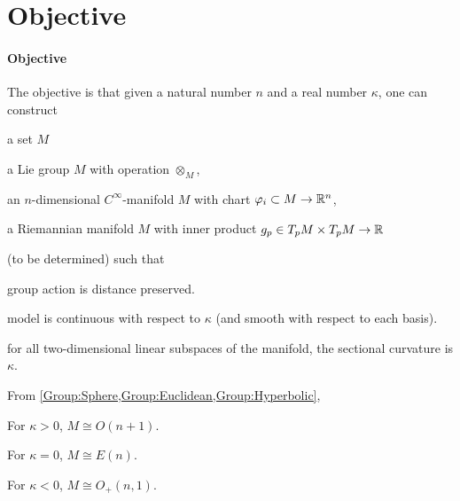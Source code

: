 \documentclass[../main.tex]{subfiles}
\begin{document}
\section{Objective}
\paragraph{Objective}\label{Objective}
The objective is that
given a natural number \(n\) and a real number \(\kappa\),
one can construct
\begin{APAenumerate}
    \item a set \(M\)
    \item a Lie group \(M\) with operation \(\otimes_M\),
    \item an \(n\)-dimensional \(C^\infty\)-manifold \(M\) with chart \(\varphi_i \subset M\to\mathbb{R}^n\),
    \item a Riemannian manifold \(M\) with inner product \(g_p\in T_pM\times T_pM\to\mathbb{R}\)
\end{APAenumerate}
(to be determined)
such that
\begin{APAitemize}
    \item group action is distance preserved.
    \item model is continuous with respect to \(\kappa\) (and smooth with respect to each basis).
    \item for all two-dimensional linear subspaces of the manifold, the sectional curvature is \(\kappa\).
\end{APAitemize}

\begin{conjecture}\label{GeometricGroupStructure}
    From \cref{Group:Sphere,Group:Euclidean,Group:Hyperbolic},
    \begin{APAitemize}
        \item For \(\kappa>0\), \(M\cong O\left(n+1\right)\).
        \item For \(\kappa=0\), \(M\cong E\left(n\right)\).
        \item For \(\kappa<0\), \(M\cong O_{+}\left(n,1\right)\).
    \end{APAitemize}
\end{conjecture}
\end{document}
